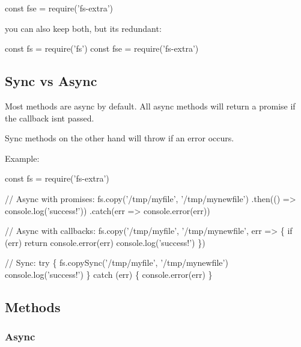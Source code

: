 \begin{DoxyCode}
const fse = require('fs-extra')
\end{DoxyCode}


you can also keep both, but it\textquotesingle{}s redundant\+:


\begin{DoxyCode}
const fs = require('fs')
const fse = require('fs-extra')
\end{DoxyCode}


\subsection*{Sync vs Async }

Most methods are async by default. All async methods will return a promise if the callback isn\textquotesingle{}t passed.

Sync methods on the other hand will throw if an error occurs.

Example\+:


\begin{DoxyCode}
const fs = require('fs-extra')

// Async with promises:
fs.copy('/tmp/myfile', '/tmp/mynewfile')
  .then(() => console.log('success!'))
  .catch(err => console.error(err))

// Async with callbacks:
fs.copy('/tmp/myfile', '/tmp/mynewfile', err => \{
  if (err) return console.error(err)
  console.log('success!')
\})

// Sync:
try \{
  fs.copySync('/tmp/myfile', '/tmp/mynewfile')
  console.log('success!')
\} catch (err) \{
  console.error(err)
\}
\end{DoxyCode}


\subsection*{Methods }

\subsubsection*{Async}


